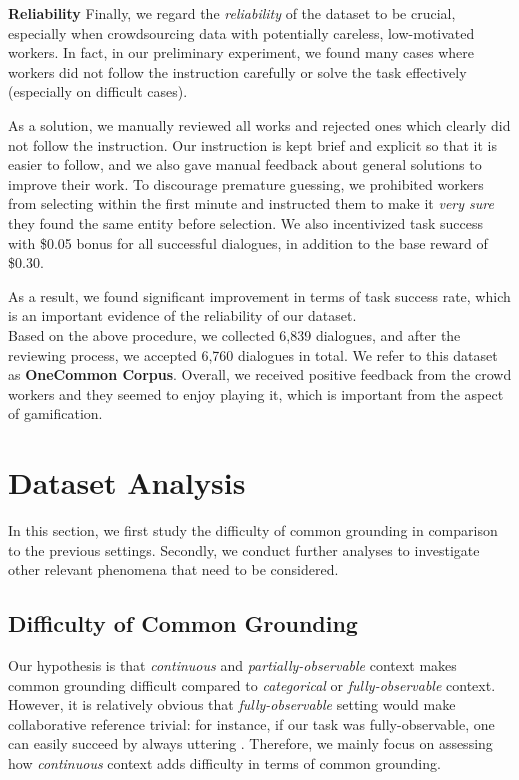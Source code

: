 \noindent
\textbf{Reliability}\quad
Finally, we regard the \emph{reliability} of the dataset to be crucial, especially when crowdsourcing data with potentially careless, low-motivated workers. In fact, in our preliminary experiment, we found many cases where workers did not follow the instruction carefully or solve the task effectively (especially on difficult cases).

As a solution, we manually reviewed all works and rejected ones which clearly did not follow the instruction. Our instruction is kept brief and explicit so that it is easier to follow, and we also gave manual feedback about general solutions to improve their work. To discourage premature guessing, we prohibited workers from selecting within the first minute and instructed them to make it \emph{very sure} they found the same entity before selection. We also incentivized task success with \$0.05 bonus for all successful dialogues, in addition to the base reward of \$0.30.

As a result, we found significant improvement in terms of task success rate, which is an important evidence of the reliability of our dataset. \\

Based on the above procedure, we collected 6,839 dialogues, and after the reviewing process, we accepted 6,760 dialogues in total. We refer to this dataset as \textbf{OneCommon Corpus}. Overall, we received positive feedback from the crowd workers and they seemed to enjoy playing it, which is important from the aspect of gamification.

\section{Dataset Analysis}
\label{03_sec:dataset_analysis}

In this section, we first study the difficulty of common grounding in comparison to the previous settings. Secondly, we conduct further analyses to investigate other relevant phenomena that need to be considered.

\subsection{Difficulty of Common Grounding}
\label{03_subsec:difficulty_analysis}

Our hypothesis is that \emph{continuous} and \emph{partially-observable} context makes common grounding difficult compared to \emph{categorical} or \emph{fully-observable} context. However, it is relatively obvious that \emph{fully-observable} setting would make collaborative reference trivial: for instance, if our task was fully-observable, one can easily succeed by always uttering . Therefore, we mainly focus on assessing how \textit{continuous} context adds difficulty in terms of common grounding.

